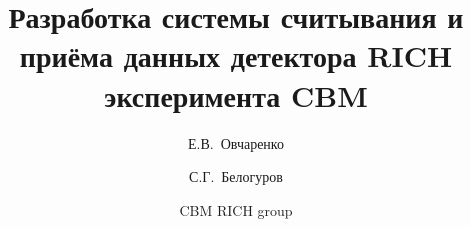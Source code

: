 \title{Разработка системы считывания и приёма данных детектора RICH эксперимента CBM}

\author[1]{Е.В.~Овчаренко}
\author[1]{С.Г.~Белогуров}
\author{CBM RICH group}

